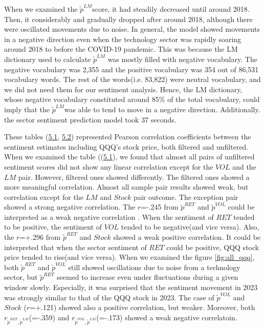 \documentclass[logo,bsc,singlespacing,parskip]{infthesis}
\begin{document}
When we examined the $\tilde{p}^{LM}$score, it had steadily decreased until around 2018. Then, it considerably and gradually dropped after around 2018, although there were oscillated movements due to noise. In general, the model showed movements in a negative direction even when the technology sector was rapidly soaring around 2018 to before the COVID-19 pandemic. This was because the LM dictionary used to calculate $\tilde{p}^{LM} $ was mostly filled with negative vocabulary. The negative vocabulary was 2,355 and the positive vocabulary was 354 out of 86,531 vocabulary words. The rest of the words(i.e. 83,822) were neutral vocabulary, and we did not need them for our sentiment analysis. Hence, the LM dictionary, whose negative vocabulary constituted around 85\% of the total vocabulary, could imply that the $\tilde{p}^{LM} $was able to tend to move in a negative direction.  Additionally. the sector sentiment prediction model took 37 seconds. 

These tables (\hyperref[tab:all_qqq_corr1]{5.1}, \hyperref[tab:all_qqq_corr2]{5.2}) represented Pearson correlation coefficients between the sentiment estimates including QQQ’s stock price, both filtered and unfiltered. When we examined the table ((\hyperref[tab:all_qqq_corr1]{5.1}), we found that almost all pairs of unfiltered sentiment scores did not show any linear correlation except for the $VOL$ and the $LM$ pair. However, filtered ones showed differently. The filtered ones showed a more meaningful correlation. Almost all sample pair results showed weak, but correlation except for the $LM$ and $Stock$ pair outcome. The exception pair showed a strong negative correlation. The $r$=-.245 from $\tilde{p}^{RET}$ and $\tilde{p}^{VOL}$ could be interpreted as a weak negative correlation \cite{NCLCorrelation}. When the sentiment of $RET$ tended to be positive, the sentiment of $VOL$  tended to be negative(and vice versa). Also, the $r$=+.296 from $\tilde{p}^{RET}$ and $Stock$ showed a weak positive correlation. It could be interpreted that when the sector sentiment of $RET$ could be positive, QQQ stock price tended to rise(and vice versa).  When we examined the figure \ref{fig:all_qqq}, both $\tilde{p}^{RET}$ and $\tilde{p}^{VOL}$ still showed oscillations due to noise from a technology sector, but $\tilde{p}^{RET}$ seemed to increase even under fluctuations during a given window slowly. Especially, it was surprised that the sentiment movement in 2023 was strongly similar to that of the QQQ stock in 2023. The case of $\tilde{p}^{VOL}$ and $Stock$ ($r$=+.121) showed also a positive correlation, but weaker. Moreover, both $r_{\tilde{p}^{RET},\tilde{p}^{LM}}$(=-.359) and $r_{\tilde{p}^{VOL},\tilde{p}^{LM}}$(=-.173) showed a weak negative correlatoin. 
\end{document}
